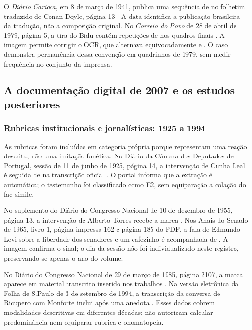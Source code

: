 O \textit{Diário Carioca}, em 8 de março de 1941, publica uma sequência de  no folhetim traduzido de Conan Doyle, página 13 \cite{carioca1941}. A data identifica a publicação brasileira da tradução, não a composição original. No \textit{Correio do Povo} de 28 de abril de 1979, página 5, a tira do Bidu contém repetições de  nos quadros finais \cite{correio1979}. A imagem permite corrigir o OCR, que alternava equivocadamente  e . O caso demonstra permanência dessa convenção em quadrinhos de 1979, sem medir frequência no conjunto da imprensa.

\subsection{A documentação digital de 2007 e os estudos posteriores}
\subsubsection{Rubricas institucionais e jornalísticas: 1925 a 1994}
As rubricas foram incluídas em categoria própria porque representam uma reação descrita, não uma imitação fonética. No Diário da Câmara dos Deputados de Portugal, sessão de 11 de junho de 1925, página 14, a intervenção de Cunha Leal é seguida de  na transcrição oficial \cite{portugal1925}. O portal informa que a extração é automática; o testemunho foi classificado como E2, sem equiparação a colação do fac-símile.

No suplemento do Diário do Congresso Nacional de 10 de dezembro de 1955, página 13, a intervenção de Alberto Torres recebe a marca  \cite{camara1955}. Nos Anais do Senado de 1965, livro 1, página impressa 162 e página 185 do PDF, a fala de Edmundo Levi sobre a liberdade dos senadores e um cafezinho é acompanhada de  \cite{senado1965}. A imagem confirma o sinal; o dia da sessão não foi individualizado neste registro, preservando-se apenas o ano do volume.

No Diário do Congresso Nacional de 29 de março de 1985, página 2107, a marca  aparece em material transcrito inserido nos trabalhos \cite{camara1985}. Na versão eletrônica da Folha de S.Paulo de 3 de setembro de 1994, a transcrição da conversa de Ricupero com Monforte inclui  após uma anedota \cite{folha1994}. Esses dados cobrem modalidades descritivas em diferentes décadas; não autorizam calcular predominância nem equiparar rubrica e onomatopeia.

